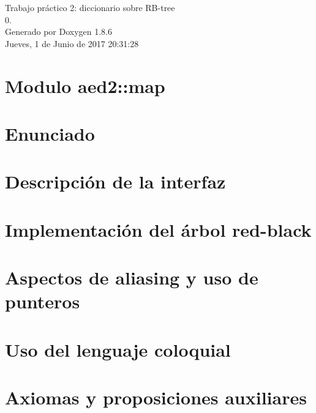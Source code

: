 \documentclass[twoside]{article}
\begin{document}
\hypersetup{pageanchor=false}
\begin{titlepage}
\vspace*{7cm}
\begin{center}%
{\Large Trabajo práctico 2\-: diccionario sobre R\-B-\/tree \\[1ex]\large 0. }\\
\vspace*{1cm}
{\large Generado por Doxygen 1.8.6}\\
\vspace*{0.5cm}
{\small Jueves, 1 de Junio de 2017 20:31:28}\\
\end{center}
\end{titlepage}
\tableofcontents
{}
\hypersetup{pageanchor=true}

\section{Modulo aed2\-:\-:map}
\label{index}\hypertarget{index}{}
\section{Enunciado}
\label{Enunciado}
\hypertarget{Enunciado}{}

\section{Descripción de la interfaz}
\label{Interfaz}
\hypertarget{Interfaz}{}

\section{Implementación del árbol red-\/black}
\label{Implementacion}
\hypertarget{Implementacion}{}

\section{Aspectos de aliasing y uso de punteros}
\label{Aliasing}
\hypertarget{Aliasing}{}

\section{Uso del lenguaje coloquial}
\label{Castellano}
\hypertarget{Castellano}{}

\section{Axiomas y proposiciones auxiliares}
\label{axiomas}
\hypertarget{axiomas}{}

\end{document}
